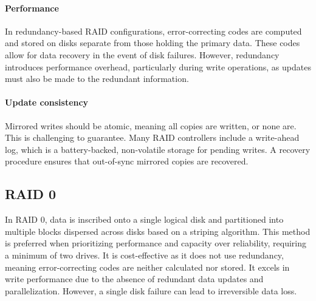 \paragraph*{Performance}
In redundancy-based RAID configurations, error-correcting codes are computed and stored on disks separate from those holding the primary data. 
These codes allow for data recovery in the event of disk failures.
However, redundancy introduces performance overhead, particularly during write operations, as updates must also be made to the redundant information.

\paragraph*{Update consistency}
Mirrored writes should be atomic, meaning all copies are written, or none are. 
This is challenging to guarantee. Many RAID controllers include a write-ahead log, which is a battery-backed, non-volatile storage for pending writes. 
A recovery procedure ensures that out-of-sync mirrored copies are recovered.

\subsection{RAID 0}
In RAID 0, data is inscribed onto a single logical disk and partitioned into multiple blocks dispersed across disks based on a striping algorithm. 
This method is preferred when prioritizing performance and capacity over reliability, requiring a minimum of two drives. 
It is cost-effective as it does not use redundancy, meaning error-correcting codes are neither calculated nor stored. 
It excels in write performance due to the absence of redundant data updates and parallelization. 
However, a single disk failure can lead to irreversible data loss.

